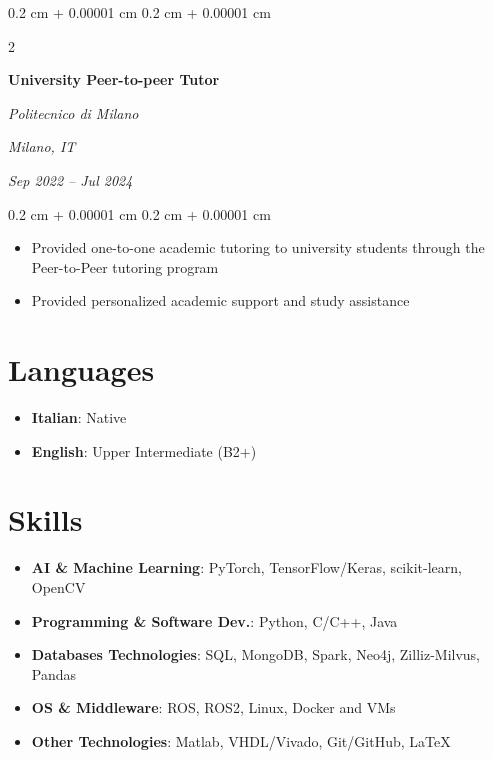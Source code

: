 \documentclass[10pt, letterpaper]{article}
\newenvironment{highlights}{
    \begin{itemize}[
        topsep=0.10 cm,
        parsep=0.10 cm,
        partopsep=0pt,
        itemsep=0pt,
        leftmargin=0.4 cm + 10pt
    ]
}{
    \end{itemize}
} %
\newenvironment{onecolentry}{
    \begin{adjustwidth}{
        0.2 cm + 0.00001 cm
    }{
        0.2 cm + 0.00001 cm
    }
}{
    \end{adjustwidth}
} %
\newenvironment{twocolentry}[2][]{
    \onecolentry
    \def\secondColumn{#2}
    \setcolumnwidth{\fill, 4.5 cm}
    \begin{paracol}{2}
}{
    \switchcolumn \raggedleft \secondColumn
    \end{paracol}
    \endonecolentry
} %
\begin{document}
    \begin{twocolentry}{
    \textit{Milano, IT}    
            
    \textit{Sep 2022 – Jul 2024}}
    \textbf{University Peer-to-peer Tutor}
            
    \textit{Politecnico di Milano}
    \end{twocolentry}
    \vspace{0.10 cm}
    \begin{onecolentry}
    \begin{highlights}
        \item Provided one-to-one academic tutoring to university students through the Peer-to-Peer tutoring program
        \item Provided personalized academic support and study assistance
    \end{highlights}
    \end{onecolentry}

\section{\mbox{{\color{black}\footnotesize\faGlobeAmericas}\hspace*{0.13cm}Languages}}

\begin{highlights}
    \item \textbf{Italian}: Native
    \item \textbf{English}: Upper Intermediate (B2+)
\end{highlights}

\section{\mbox{{\color{black}\footnotesize\faWrench}\hspace*{0.13cm}Skills}}

    \begin{samepage}
    \begin{highlights}
        \item \textbf{AI \& Machine Learning}: PyTorch, TensorFlow/Keras, scikit-learn, OpenCV
        \item \textbf{Programming \& Software Dev.}: Python, C/C++, Java
        \item \textbf{Databases Technologies}: SQL, MongoDB, Spark, Neo4j, Zilliz-Milvus, Pandas
        \item \textbf{OS \& Middleware}: ROS, ROS2, Linux, Docker and VMs
        \item \textbf{Other Technologies}: Matlab, VHDL/Vivado,  Git/GitHub, \LaTeX
    \end{highlights}
    \end{samepage}
\end{document}
